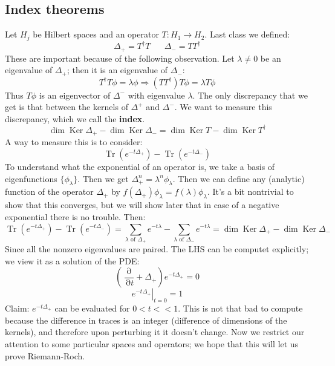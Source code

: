 \documentclass[12 pt]{article}
\DeclareMathOperator {\p} {\partial}
\DeclareMathOperator {\Tr}{Tr}
\DeclareMathOperator {\Ker}{Ker}
\theoremstyle{plain}
\theoremstyle{definition}
\theoremstyle{remark}
\begin{document}
\subsection*{Index theorems}
Let $H_j$ be Hilbert spaces and an operator $T:H_1 \to H_2$. Last class we defined:
\[     \Delta_+ = T^{\dagger}T \;\;\;\;\;\; \Delta_- = T T^{\dagger}     \]
These are important because of the following observation. Let $\lambda \neq 0$ be an eigenvalue of $\Delta_+$; then it is an eigenvalue of $\Delta_-$:
\[     T^{\dagger}T \phi = \lambda \phi \Rightarrow (TT^{\dagger}) T \phi = \lambda T \phi     \]
Thus $T \phi$ is an eigenvector of $\Delta^-$ with eigenvalue $\lambda$. The only discrepancy that we get is that between the kernels of $\Delta^+$ and $\Delta^-$. We want to measure this discrepancy, which we call the \textbf{index}.
\[     \dim \Ker \Delta_+ - \dim \Ker \Delta_- = \dim \Ker T - \dim \Ker T^{\dagger}     \]
A way to measure this is to consider:
\[    \Tr(e^{-t\Delta_+}) - \Tr(e^{-t\Delta_-})    \]
To understand what the exponential of an operator is, we take a basis of eigenfunctions $\{\phi_{\lambda}\}$. Then we get $\Delta_+^n = \lambda^n \phi_{\lambda}$. Then we can define any (analytic) function of the operator $\Delta_+$ by $f(\Delta_+) \phi_{\lambda} = f(\lambda) \phi_{\lambda}$. It's a bit nontrivial to show that this converges, but we will show later that in case of a negative exponential there is no trouble. Then:
\[     \Tr(e^{-t\Delta_+}) - \Tr(e^{-t\Delta_-}) = \sum_{\lambda \text{ of } \Delta_+} e^{-t\lambda} -  \sum_{\lambda \text{ of } \Delta_-} e^{-t\lambda}  =  \dim \Ker \Delta_+ - \dim \Ker \Delta_- \]
Since all the nonzero eigenvalues are paired. The LHS can be computet explicitly; we view it as a solution of the PDE:
\[      \left( \frac{\p}{\p t} + \Delta_+  \right) e^{-t\Delta_+}  = 0   \]
\[    \left.   e^{-t\Delta_+} \right|_{t=0} = 1     \]
Claim: $e^{-t\Delta_+}$ can be evaluated for $0<t<<1$. This is not that bad to compute because the difference in traces is an integer (difference of dimensions of the kernels), and therefore upon perturbing it it doesn't change. Now we restrict our attention to some particular spaces and operators; we hope that this will let us prove Riemann-Roch.
\end{document}
